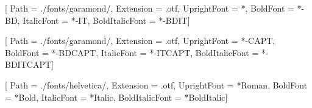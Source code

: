 \usepackage{fontspec}

\setmainfont{GARAMONDPREMRPRO}[%
    Path            = ./fonts/garamond/,
    Extension       = .otf,
    UprightFont     = *,
    BoldFont        = *-BD,
    ItalicFont      = *-IT,
    BoldItalicFont  = *-BDIT]

\newfontfamily{}[%
    Path            = ./fonts/garamond/,
    Extension       = .otf,
    UprightFont     = *-CAPT,
    BoldFont        = *-BDCAPT,
    ItalicFont      = *-ITCAPT,
    BoldItalicFont  = *-BDITCAPT]

\newfontfamily{}[%
    Path            = ./fonts/helvetica/,
    Extension       = .otf,
    UprightFont     = *Roman,
    BoldFont        = *Bold,
    ItalicFont      = *Italic,
    BoldItalicFont  = *BoldItalic]

\renewcommand{\sffamily}{\Helvetica}




\usepackage[math-style=ISO, bold-style=ISO]{unicode-math}